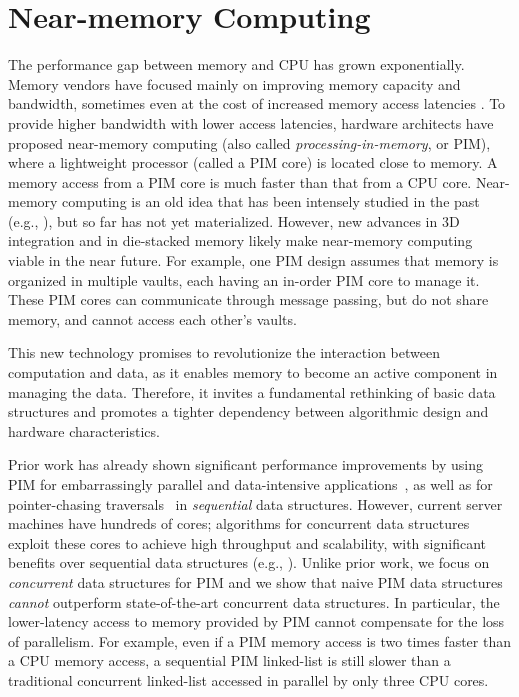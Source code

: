 \section{Near-memory Computing}

The performance gap between memory and CPU has grown exponentially. 
Memory vendors have focused mainly on improving memory capacity and bandwidth, 
sometimes even at the cost of increased memory access latencies 
\cite{Chang:2016, DBLP:conf/hpca/LeeKPKSCM15}. 
To provide higher bandwidth with lower access latencies, hardware architects 
have proposed near-memory computing (also called \textit{processing-in-memory}, 
or PIM), where a lightweight processor (called a PIM core) is located close to 
memory. A memory access from a PIM core is much faster than that from a CPU 
core. 
Near-memory computing is an old idea that has been intensely studied in the 
past (e.g., 
\cite{Stone1970, Kogge1994, Gokhale1995, Patterson1997, Oskin1998, 
KangHYKGLTP99, Hall1999, Elliott:1992}), 
but so far has not yet materialized. However, new advances in 3D integration and 
in die-stacked memory 
likely make near-memory computing viable in the near future. 
For example, one PIM design \cite{Ahn2015:2, Zhang2014:TTP, Ahn2015:1, boroumand2016} assumes 
that 
memory is organized in multiple vaults, each having an in-order PIM core to 
manage it. 
These PIM cores can communicate through message passing, but do not share memory, 
and cannot access each other's vaults. 

This new technology promises to revolutionize the interaction between 
computation and data, 
as it enables memory to become an active component in managing the data. 
Therefore, it invites a fundamental rethinking of basic data structures and 
promotes a tighter dependency between algorithmic design and hardware 
characteristics. 

Prior work has already shown significant performance improvements by using PIM 
for embarrassingly parallel 
and data-intensive applications~\cite{Zhang2014:TTP, Ahn2015:2, ZhuASSHPF13, 
Akin2015:DRM, Hsieh:2016:TOM}, 
as well as for pointer-chasing traversals~\cite{hsieh2016accelerating} in 
\emph{sequential} data structures. 
However, current server machines have hundreds of cores; 
algorithms for concurrent data structures exploit these cores to achieve high 
throughput and scalability, 
with significant benefits over sequential data structures 
(e.g., \cite{practicallf, skiplists-concpugh, valois, Herlihy08}).
Unlike prior work, we focus on \emph{concurrent} data structures for PIM 
and we show that naive PIM data structures \emph{cannot} outperform 
state-of-the-art concurrent data structures. 
In particular, the lower-latency access to memory provided by PIM cannot 
compensate 
for the loss of parallelism. 
For example, even if a PIM memory access is two times faster than a CPU memory access, a 
sequential PIM linked-list is still slower than a traditional concurrent linked-list accessed in parallel by only three 
CPU cores.

